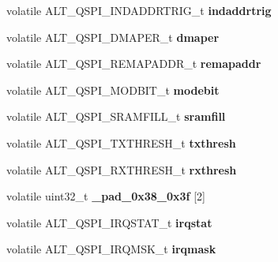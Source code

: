 \begin{DoxyCompactItemize}
volatile A\+L\+T\+\_\+\+Q\+S\+P\+I\+\_\+\+I\+N\+D\+A\+D\+D\+R\+T\+R\+I\+G\+\_\+t {\bfseries indaddrtrig}
\item 
\mbox{\label{structALT__QSPI__s_a8ab97cd234b81e7bd66f1da9284467f4}} 
volatile A\+L\+T\+\_\+\+Q\+S\+P\+I\+\_\+\+D\+M\+A\+P\+E\+R\+\_\+t {\bfseries dmaper}
\item 
\mbox{\label{structALT__QSPI__s_a4f489ceac9ddd92790015fa61ac4afb2}} 
volatile A\+L\+T\+\_\+\+Q\+S\+P\+I\+\_\+\+R\+E\+M\+A\+P\+A\+D\+D\+R\+\_\+t {\bfseries remapaddr}
\item 
\mbox{\label{structALT__QSPI__s_a05115434281710e6d5499ea8d66f3051}} 
volatile A\+L\+T\+\_\+\+Q\+S\+P\+I\+\_\+\+M\+O\+D\+B\+I\+T\+\_\+t {\bfseries modebit}
\item 
\mbox{\label{structALT__QSPI__s_aa3492936bd6e7450d3adfa2d9276346d}} 
volatile A\+L\+T\+\_\+\+Q\+S\+P\+I\+\_\+\+S\+R\+A\+M\+F\+I\+L\+L\+\_\+t {\bfseries sramfill}
\item 
\mbox{\label{structALT__QSPI__s_a05710eab8383526ce4e7dfdca7fdcf37}} 
volatile A\+L\+T\+\_\+\+Q\+S\+P\+I\+\_\+\+T\+X\+T\+H\+R\+E\+S\+H\+\_\+t {\bfseries txthresh}
\item 
\mbox{\label{structALT__QSPI__s_ab35d2ed0e9a4ef93ba30390dd8d5b336}} 
volatile A\+L\+T\+\_\+\+Q\+S\+P\+I\+\_\+\+R\+X\+T\+H\+R\+E\+S\+H\+\_\+t {\bfseries rxthresh}
\item 
\mbox{\label{structALT__QSPI__s_a391cc3c42d410832b78a594d8b346740}} 
volatile uint32\+\_\+t {\bfseries \+\_\+pad\+\_\+0x38\+\_\+0x3f} \mbox{[}2\mbox{]}
\item 
\mbox{\label{structALT__QSPI__s_a1ec6b54541e624c840e0f34a92b58b9a}} 
volatile A\+L\+T\+\_\+\+Q\+S\+P\+I\+\_\+\+I\+R\+Q\+S\+T\+A\+T\+\_\+t {\bfseries irqstat}
\item 
\mbox{\label{structALT__QSPI__s_a13033bdf148d96f487b775f6d50b97d4}} 
volatile A\+L\+T\+\_\+\+Q\+S\+P\+I\+\_\+\+I\+R\+Q\+M\+S\+K\+\_\+t {\bfseries irqmask}
\item 
\mbox{\label{structALT__QSPI__s_abedd3ac44f9a0737a02839e716c8ff4e}} 

\end{DoxyCompactItemize}
